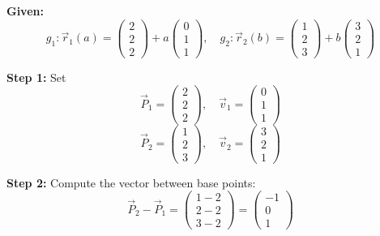 \textbf{Given:}
\[
	g_1: \vec{r}_1(a) = \begin{pmatrix} 2 \\ 2 \\ 2 \end{pmatrix} + a \begin{pmatrix} 0 \\ 1 \\ 1 \end{pmatrix}, \quad
	g_2: \vec{r}_2(b) = \begin{pmatrix} 1 \\ 2 \\ 3 \end{pmatrix} + b \begin{pmatrix} 3 \\ 2 \\ 1 \end{pmatrix}
\]

\textbf{Step 1:} Set
\[
	\vec{P}_1 = \begin{pmatrix} 2 \\ 2 \\ 2 \end{pmatrix}, \quad \vec{v}_1 = \begin{pmatrix} 0 \\ 1 \\ 1 \end{pmatrix}
\]
\[
	\vec{P}_2 = \begin{pmatrix} 1 \\ 2 \\ 3 \end{pmatrix}, \quad \vec{v}_2 = \begin{pmatrix} 3 \\ 2 \\ 1 \end{pmatrix}
\]

\textbf{Step 2:} Compute the vector between base points:
\[
	\vec{P}_2 - \vec{P}_1 = \begin{pmatrix} 1 - 2 \\ 2 - 2 \\ 3 - 2 \end{pmatrix} = \begin{pmatrix} -1 \\ 0 \\ 1 \end{pmatrix}
\]

